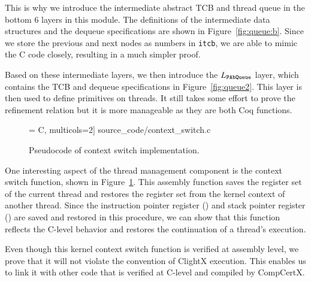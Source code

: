 This is why we introduce the intermediate abstract TCB and thread
queue in the bottom 6 layers in this module.  The definitions of the
intermediate data structures 
and the dequeue specifications are shown in
Figure~\ref{fig:queue:b}.
Since we store the previous and next
nodes as numbers in \verb"itcb", we are able to mimic the C code
closely, resulting in a much simpler proof.

Based on these intermediate layers, we then introduce the
$L_\code{PAbQueue}$ layer, which contains the TCB and dequeue specifications in
Figure~\ref{fig:queue2}. This layer is then used to define
primitives on threads.  It still takes some effort to prove the
refinement relation but it is more manageable as they are both Coq
functions. 

\begin{figure}[t]
 = C, multicols=2] {source_code/context_switch.c}
\caption{Pseudocode of context switch implementation.}
\label{fig:exp:cswitch}
\hrulefill
\end{figure}

One interesting aspect of the thread management component is the 
context switch function, shown in Figure~\ref{fig:exp:cswitch}. 
This assembly function saves the register set
of the current thread and restores the register set from 
the kernel context of another thread.
Since the instruction pointer register () and stack pointer register () 
are saved and restored in this procedure,
we can show that this function reflects the C-level behavior
and restores the continuation of a thread's execution.
\begin{mathpar}
\end{mathpar}%
Even though this kernel context switch function is verified at 
assembly level,
we prove that it will not violate the convention of
ClightX execution.
This enables us to link it with other code that is verified at C-level
and compiled by CompCertX. 


